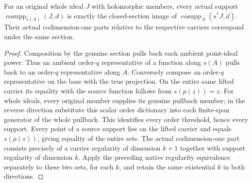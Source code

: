 \begin{lemma}
\label{hir:actual-section-codimension-one-dictionary}
\leanok
For an original whole ideal $J$ with holomorphic members, every actual support
$\operatorname{cosupp}_{s(A)}(J,d)$ is exactly the closed-section image of
$\operatorname{cosupp}_{A}(s^*J,d)$. Their actual codimension-one parts relative
to the respective carriers correspond under the same section.
\end{lemma}
\begin{proof}
Composition by the genuine section pulls back each ambient point-ideal power.
Thus an ambient order-$q$ representative of a function along $s(A)$ pulls back
to an order-$q$ representative along $A$. Conversely compose an order-$q$
representative on the base with the true projection. On the entire same lifted
carrier its equality with the source function follows from $s(p(z))=z$.
For whole ideals, every original member supplies its genuine pullback member;
in the reverse direction substitute this scalar order dictionary into each
finite-span generator of the whole pullback. This identifies every order
threshold, hence every support. Every point of a source support lies on the
lifted carrier and equals $s(p(z))$, giving equality of the entire sets.
The actual codimension-one part consists precisely of a carrier regularity
of dimension $k+1$ together with support regularity of dimension $k$.
Apply the preceding native regularity equivalence separately to these two
sets, for each $k$, and retain the same existential $k$ in both directions.
\end{proof}

